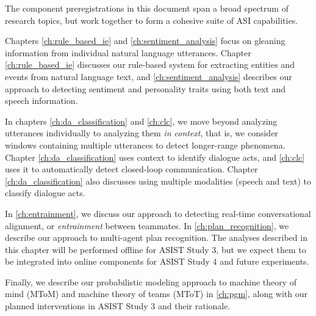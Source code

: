 The component preregistrations in this document span a broad spectrum of
research topics, but work together to form a cohesive suite of ASI
capabilities.

Chapters \ref{ch:rule_based_ie} and \ref{ch:sentiment_analysis} focus on
gleaning information from individual natural language utterances. Chapter
\ref{ch:rule_based_ie} discusses our rule-based system for extracting entities
and events from natural language text, and \autoref{ch:sentiment_analysis}
describes our approach to detecting sentiment and personality traits using both
text and speech information.

In chapters \ref{ch:da_classification} and \ref{ch:clc}, we move
beyond analyzing utterances individually to analyzing them \emph{in context},
that is, we consider windows containing multiple utterances to detect
longer-range phenomena. Chapter \ref{ch:da_classification} uses context to identify
dialogue acts, and \autoref{ch:clc} uses it to automatically detect
closed-loop communication. Chapter \ref{ch:da_classification} also discusses
using multiple modalities (speech and text) to classify dialogue acts.

In \autoref{ch:entrainment}, we discuss our approach to detecting real-time
conversational alignment, or \emph{entrainment} between teammates. In
\autoref{ch:plan_recognition}, we describe our approach to multi-agent plan
recognition. The analyses described in this chapter will be performed offline
for ASIST Study 3, but we expect them to be integrated into online components
for ASIST Study 4 and future experiments.

Finally, we describe our probabilistic modeling approach to machine theory of
mind (MToM) and machine theory of teams (MToT) in \autoref{ch:pgm}, along with
our planned interventions in ASIST Study 3 and their rationale.
